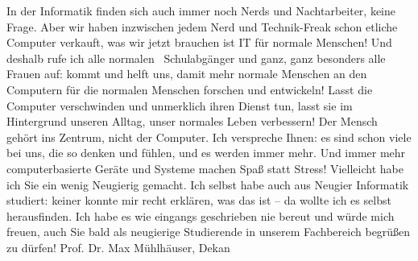 {In der Informatik finden sich auch immer noch Nerds und Nachtarbeiter, keine Frage. Aber wir haben inzwischen jedem Nerd und Technik-Freak schon etliche Computer verkauft, was wir jetzt brauchen ist IT für normale Menschen! Und deshalb rufe ich alle \glqq normalen\grqq~ Schulabgänger und ganz, ganz besonders alle Frauen auf: kommt und helft uns, damit mehr normale Menschen an den Computern für die normalen Menschen forschen und entwickeln! Lasst die Computer verschwinden und unmerklich ihren Dienst tun, lasst sie im Hintergrund unseren Alltag, unser normales Leben verbessern! Der Mensch gehört ins Zentrum, nicht der Computer. Ich verspreche Ihnen: es sind schon viele bei uns, die so denken und fühlen, und es werden immer mehr. Und immer mehr computerbasierte Geräte und Systeme machen Spaß statt Stress!
Vielleicht habe ich Sie ein wenig Neugierig gemacht. Ich selbst habe auch aus Neugier Informatik studiert: keiner konnte mir recht erklären, was das ist -- da wollte ich es selbst herausfinden. Ich habe es wie eingangs geschrieben nie bereut und würde mich freuen, auch Sie bald als neugierige Studierende in unserem Fachbereich begrüßen zu dürfen!
}{Prof. Dr. Max Mühlhäuser, Dekan}
